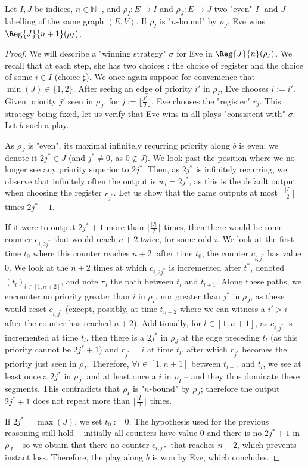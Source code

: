\documentclass[a4paper,UKenglish,cleveref, autoref, thm-restate]{lipics-v2021}
\newcommand{\NN}{\mathbb{N}}
\begin{document}
\begin{lemma}\label{cl:bounded-to-strategy}
	Let $I,J$ be indices, $n \in \NN^+$, and $\rho_I:E\rightarrow I$ and $\rho_J:E\rightarrow J$ two "even" $I$- and $J$- labelling of the same graph $(E,V)$. If $\rho_I$ is "$n$-bound" by $\rho_J$, Eve wins $\Reg{J}{n+1}(\rho_I)$.
\end{lemma}
\begin{proof}
	We will describe a "winning strategy" $\sigma$ for Eve in $\Reg{J}{n}(\rho_I)$. We recall that at each step, she has two choices : the choice of register and the choice of some $i\in I$ (choice $\sharp$). We once again suppose for convenience that $\min(J)\in \{1,2\}$. After seeing an edge of priority $i'$ in $\rho_I$, Eve chooses $i:= i'$. Given priority $j'$ seen in $\rho_J$, for $j:= \lfloor \frac{j'}{2}\rfloor$, Eve chooses the "register" $r_j$. This strategy being fixed, let us verify that Eve wins in all plays "consistent with" $\sigma$. Let $b$ such a play.
	
	As $\rho_J$ is "even", its maximal infinitely recurring priority along $b$ is even; we denote it $2j^{*} \in J$ (and $j^* \neq 0$, as $0 \notin J$). We look past the position where we no longer see any priority superior to $2j^*$. Then, as $2j^*$ is infinitely recurring, we observe that infinitely often the output is $w_l = 2j^*$, as this is the default output when choosing the register $r_{j^*}$. Let us show that the game outputs at most $\lceil\frac{|I|}{2}\rceil$ times $2j^*+1$.
	
	If it were to output $2j^*+1$ more than $\lceil\frac{|I|}{2}\rceil$ times, then there would be some counter $c_{i,2j^*}$ that would reach $n+2$ twice, for some odd $i$. We look at the first time $t_0$ where this counter reaches $n+2$: after time $t_0$, the counter $c_{i,j^*}$ has value $0$. We look at the $n+2$ times at which $c_{i, 2j^*}$ is incremented after $t^*$, denoted $(t_l)_{l\in [1,n+2]}$, and note $\pi_l$ the path between $t_l$ and $t_{l+1}$. Along these paths, we encounter no priority greater than $i$ in $\rho_I$, nor greater than $j^*$ in $\rho_J$, as these would reset $c_{i,j^*}$ (except, possibly, at time $t_{n+2}$ where we can witness a $i'>i$ after the counter has reached $n+2$). Additionally, for $l\in [1,n+1]$, as $c_{i,j^*}$ is incremented at time $t_l$, then there is a $2j^*$ in $\rho_J$ at the edge preceding $t_l$ (as this priority cannot be $2j^*+1$) and $r_{j^*} = i$ at time $t_l$, after which $r_{j^*}$ becomes the priority just seen in $\rho_I$. Therefore, $\forall l \in [1,n+1]$ between $t_{l-1}$ and $t_l $, we see at least once a $2j^*$ in $\rho_J$, and at least once a $i$ in $\rho_I$ – and they thus dominate these segments. This contradicts that $\rho_I$ is "$n$-bound" by $\rho_J$; therefore the output $2j^*+1$ does not repeat more than $\lceil\frac{|I|}{2}\rceil$ times.
	
	If $2j^* = \max(J)$, we set $t_0 := 0$. The hypothesis used for the previous reasoning still hold – initially all counters have value 0 and there is no $2j^*+1$ in $\rho_J$ – so we obtain that there no counter $c_{i,j*}$ that reaches $n+2$, which prevents instant loss.
	Therefore, the play along $b$ is won by Eve, which concludes.
\end{proof}
\end{document}
